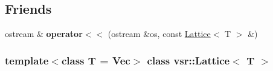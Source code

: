 \subsection*{Friends}
\begin{DoxyCompactItemize}
\item 
\hypertarget{classvsr_1_1_lattice_a30b34c9757a420e544ef5089bc7a0c99}{ostream \& {\bfseries operator$<$$<$} (ostream \&os, const \hyperlink{classvsr_1_1_lattice}{Lattice}$<$ T $>$ \&)}\label{classvsr_1_1_lattice_a30b34c9757a420e544ef5089bc7a0c99}

\end{DoxyCompactItemize}
\subsubsection*{template$<$class T = Vec$>$ class vsr\-::\-Lattice$<$ T $>$}



